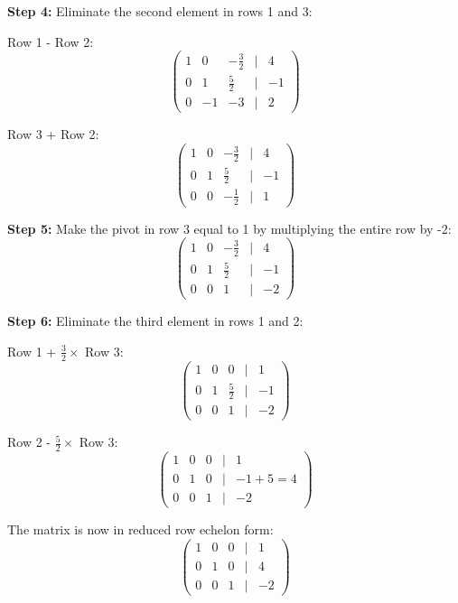 \textbf{Step 4:} Eliminate the second element in rows 1 and 3:

Row 1 - Row 2:
\begin{equation*}
\begin{pmatrix}
1 & 0 & -\frac{3}{2} & | & 4 \\
0 & 1 & \frac{5}{2} & | & -1 \\
0 & -1 & -3 & | & 2
\end{pmatrix}
\end{equation*}

Row 3 + Row 2:
\begin{equation*}
\begin{pmatrix}
1 & 0 & -\frac{3}{2} & | & 4 \\
0 & 1 & \frac{5}{2} & | & -1 \\
0 & 0 & -\frac{1}{2} & | & 1
\end{pmatrix}
\end{equation*}

\textbf{Step 5:} Make the pivot in row 3 equal to 1 by multiplying the entire row by -2:
\begin{equation*}
\begin{pmatrix}
1 & 0 & -\frac{3}{2} & | & 4 \\
0 & 1 & \frac{5}{2} & | & -1 \\
0 & 0 & 1 & | & -2
\end{pmatrix}
\end{equation*}

\textbf{Step 6:} Eliminate the third element in rows 1 and 2:

Row 1 + $\frac{3}{2} \times$ Row 3:
\begin{equation*}
\begin{pmatrix}
1 & 0 & 0 & | & 1 \\
0 & 1 & \frac{5}{2} & | & -1 \\
0 & 0 & 1 & | & -2
\end{pmatrix}
\end{equation*}

Row 2 - $\frac{5}{2} \times$ Row 3:
\begin{equation*}
\begin{pmatrix}
1 & 0 & 0 & | & 1 \\
0 & 1 & 0 & | & -1 + 5 = 4 \\
0 & 0 & 1 & | & -2
\end{pmatrix}
\end{equation*}

The matrix is now in reduced row echelon form:
\begin{equation*}
\begin{pmatrix}
1 & 0 & 0 & | & 1 \\
0 & 1 & 0 & | & 4 \\
0 & 0 & 1 & | & -2
\end{pmatrix}
\end{equation*}

